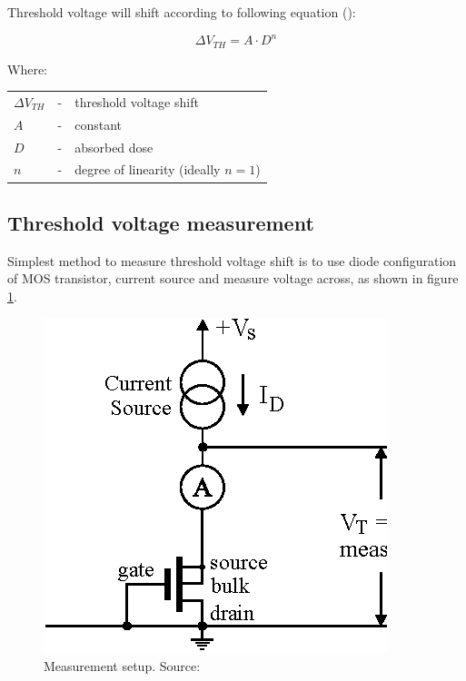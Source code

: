        Threshold voltage will shift according to following equation (\cite{pMOS_dosimeters_radfets}):
        
        $$\Delta V_{TH} = A \cdot D^n$$
        
        Where:
        
        \begin{tabular}{lcl}
            $\Delta V_{TH}$ & - & threshold voltage shift \\
            $A$ & - & constant \\
            $D$ & - & absorbed dose \\
            $n$ & - & degree of linearity (ideally $n = 1$) \\
        \end{tabular}
        \bigskip
        


    \subsection{Threshold voltage measurement}
        Simplest method to measure threshold voltage shift is to use diode configuration of MOS transistor, current source and measure voltage across, as shown in figure \ref{MOS_measurement_setup}.

        \begin{figure}[H]
            \centering
            \includegraphics[width=0.3\paperwidth]{img/03/Vth-measurement-setup.eps}
            \caption{Measurement setup. Source: \cite{pMOS_dosimeters_radfets}}
            \label{MOS_measurement_setup}
        \end{figure}

